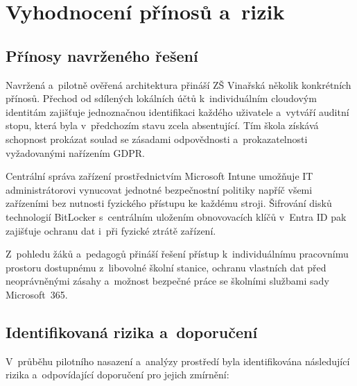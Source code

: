 \documentclass[male,czech,api_bc]{kitheses}
\begin{document}
\section{Vyhodnocení přínosů a~rizik}

\subsection{Přínosy navrženého řešení}

Navržená a~pilotně ověřená architektura přináší ZŠ Vinařská několik 
konkrétních přínosů. Přechod od sdílených lokálních účtů k~individuálním 
cloudovým identitám zajišťuje jednoznačnou identifikaci každého uživatele 
a~vytváří auditní stopu, která byla v~předchozím stavu zcela absentující. 
Tím škola získává schopnost prokázat soulad se zásadami odpovědnosti 
a~prokazatelnosti vyžadovanými nařízením GDPR.

Centrální správa zařízení prostřednictvím Microsoft Intune umožňuje 
IT administrátorovi vynucovat jednotné bezpečnostní politiky napříč 
všemi zařízeními bez nutnosti fyzického přístupu ke každému stroji. 
Šifrování disků technologií BitLocker s~centrálním uložením obnovovacích 
klíčů v~Entra ID pak zajišťuje ochranu dat i~při fyzické ztrátě zařízení.

Z~pohledu žáků a~pedagogů přináší řešení přístup k~individuálnímu 
pracovnímu prostoru dostupnému z~libovolné školní stanice, ochranu 
vlastních dat před neoprávněnými zásahy a~možnost bezpečné práce 
se školními službami sady Microsoft~365.

\subsection{Identifikovaná rizika a~doporučení}

V~průběhu pilotního nasazení a~analýzy prostředí byla identifikována 
následující rizika a~odpovídající doporučení pro jejich zmírnění:
\end{document}
